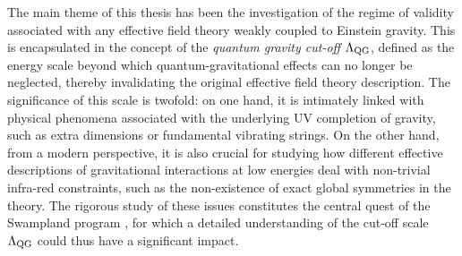 \thispagestyle{simple}

The main theme of this thesis has been the investigation of the regime of validity associated with any effective field theory weakly coupled to Einstein gravity. This is encapsulated in the concept of the \emph{quantum gravity cut-off} $\Lambda_{\text{QG}}$, defined as the energy scale beyond which quantum-gravitational effects can no longer be neglected, thereby invalidating the original effective field theory description. The significance of this scale is twofold: on one hand, it is intimately linked with physical phenomena associated with the underlying UV completion of gravity, such as extra dimensions or fundamental vibrating strings. On the other hand, from a modern perspective, it is also crucial for studying how different effective descriptions of gravitational interactions at low energies deal with non-trivial infra-red constraints, such as the non-existence of exact global symmetries in the theory. The rigorous study of these issues constitutes the central quest of the Swampland program \cite{Vafa:2005ui}, for which a detailed understanding of the cut-off scale $\Lambda_{\text{QG}}$ could thus have a significant impact.


